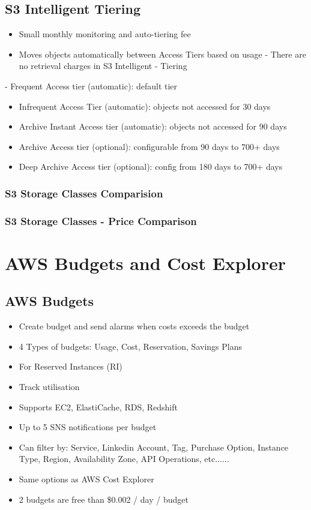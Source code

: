 \subsection{S3 Intelligent Tiering}
\begin{itemize}
    \item Small monthly monitoring and auto-tiering fee
    \item Moves objects automatically between Access Tiers based on usage
    - There are no retrieval charges in S3 Intelligent - Tiering
\end{itemize}

- Frequent Access tier (automatic): default tier
\begin{itemize}
    \item Infrequent Access Tier (automatic): objects not accessed for 30 days
    \item Archive Instant Access tier (automatic): objects not accessed for 90 days
    \item Archive Access tier (optional): configurable from 90 days to 700+ days
    \item Deep Archive Access tier (optional): config from 180 days to 700+ days
\end{itemize}

\subsubsection{S3 Storage Classes Comparision}

\subsubsection{S3 Storage Classes - Price Comparison}


\section{AWS Budgets and Cost Explorer}

\subsection{AWS Budgets}
\begin{itemize}
    \item Create budget and send alarms when costs exceeds the budget
    \item 4 Types of budgets: Usage, Cost, Reservation, Savings Plans
    \item For Reserved Instances (RI)
    \item Track utilisation
    \item Supports EC2, ElastiCache, RDS, Redshift
    \item Up to 5 SNS notifications per budget
    \item Can filter by: Service, Linkedin Account, Tag, Purchase Option, Instance Type, Region, Availability Zone, API Operations, etc......
    \item Same options as AWS Cost Explorer
    \item 2 budgets are free than \$0.002 / day / budget
\end{itemize}

